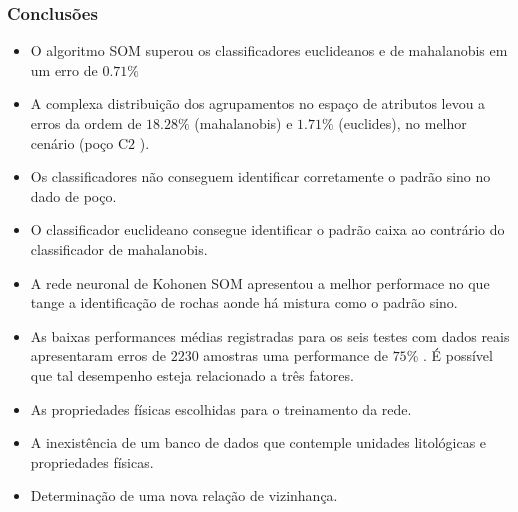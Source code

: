 \documentclass[aspectratio=10]{beamer} %
\begin{document}
\begin{frame}
\frametitle{Conclusões}

\begin{small}


	\begin{itemize}
		\footnotesize
		\item O algoritmo SOM superou os classificadores euclideanos e de mahalanobis em um erro de $0.71\%$
		\pause
		\item A complexa distribuição dos agrupamentos no espaço de atributos levou a erros da ordem de $18.28\%$ (mahalanobis) e $1.71\%$ (euclides), no melhor cenário (poço C$2$ ).
		\pause
		\item Os classificadores não conseguem identificar corretamente o padrão sino no dado de poço. 
		\pause
		\item O classificador euclideano consegue identificar o padrão caixa ao contrário do classificador de mahalanobis.
		\pause
		\item A rede neuronal de Kohonen SOM apresentou a melhor performace no que tange a identificação de rochas aonde há mistura como o padrão sino.
		\pause
		\item As baixas performances médias registradas para os seis testes com dados reais apresentaram erros de $2230$ amostras uma performance de $75\%$ . É possível que tal desempenho esteja relacionado a três fatores.
		\pause
		\item As propriedades físicas escolhidas para o treinamento da rede.
		\pause
		\item A inexistência de um banco de dados que contemple unidades litológicas e propriedades físicas.
		\pause
		\item Determinação de uma nova relação de vizinhança. 
	\end{itemize}

\end{small}	
\end{frame}




\end{document}
